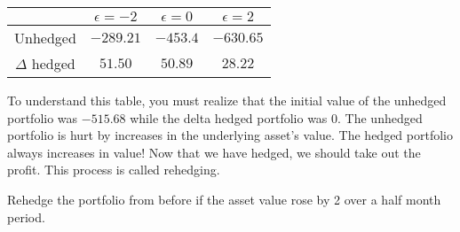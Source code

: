 \documentclass{ximera}
\begin{document}
\begin{center}
	\begin{tabular}{c|ccc}
				& $\epsilon=-2$ 	& $\epsilon=0$ 	& $\epsilon=2$\\
	\hline
	Unhedged 		& $-289.21$ 		& $-453.4$ 		& $-630.65$\\
	$\Delta$ hedged 	& $51.50$ 		& $50.89$ 		& $28.22$
	\end{tabular}
\end{center}

To understand this table, you must realize that the initial value of the unhedged portfolio was $-515.68$ while the delta hedged portfolio was 0. The unhedged portfolio is hurt by increases in the underlying asset's value. The hedged portfolio always increases in value! Now that we have hedged, we should take out the profit. This process is called rehedging.

\begin{example}
Rehedge the portfolio from before if the asset value rose by 2 over a half month period.
\end{example}
\end{document}
